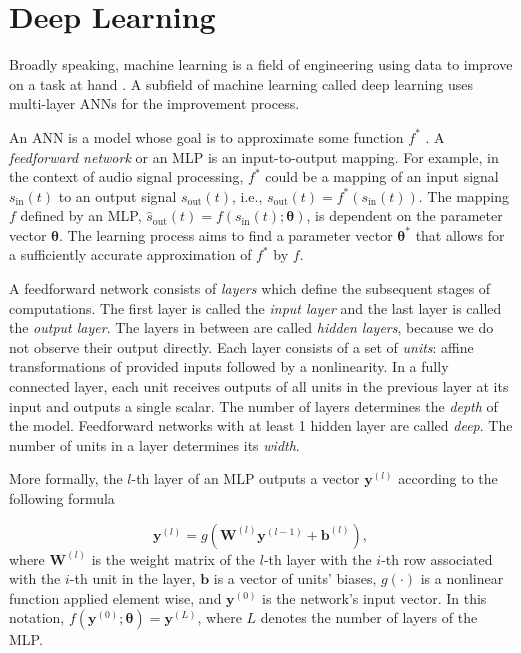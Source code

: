 
\section{Deep Learning}
\label{section:deep_learning}

Broadly speaking, machine learning is a field of engineering using data to improve on a task at hand \cite{Goodfellow-et-al-2016}. A subfield of machine learning called deep learning uses multi-layer \acp{ANN} for the improvement process. 

An \ac{ANN} is a model whose goal is to approximate some function $f^*$ \cite{Goodfellow-et-al-2016}. A \emph{feedforward network} or an \ac{MLP} is an input-to-output mapping. For example, in the context of audio signal processing, $f^*$ could be a mapping of an input signal $s_\text{in}(t)$ to an output signal $s_\text{out}(t)$, i.e., $s_\text{out}(t) = f^*(s_\text{in}(t))$. The mapping $f$ defined by an \ac{MLP}, $\hat{s}_\text{out}(t) = f(s_\text{in}(t); \pmb{\theta})$, is dependent on the parameter vector $\pmb{\theta}$. The learning process aims to find a parameter vector $\pmb{\theta^*}$ that allows for a sufficiently accurate approximation of $f^*$ by $f$.


A feedforward network consists of \emph{layers} which define the subsequent stages of computations. The first layer is called the \emph{input layer} and the last layer is called the \emph{output layer}. The layers in between are called \emph{hidden layers}, because we do not observe their output directly. Each layer consists of a set of \emph{units}: affine transformations of provided inputs followed by a nonlinearity. In a fully connected layer, each unit receives outputs of all units in the previous layer at its input and outputs a single scalar. The number of layers determines the \emph{depth} of the model. Feedforward networks with at least 1 hidden layer are called \emph{deep}. The number of units in a layer determines its \emph{width}.

More formally, the $l$-th layer of an \ac{MLP} outputs a vector $\pmb{y}^{(l)}$ according to the following formula

\begin{equation}
  \pmb{y}^{(l)} = g ( \pmb{W}^{(l)} \pmb{y}^{(l-1)} + \pmb{b}^{(l)}),
  \label{eq:mlp_forward_pass}
\end{equation}
where $\pmb{W}^{(l)}$ is the weight matrix of the $l$-th layer with the $i$-th row associated with the $i$-th unit in the layer, $\pmb{b}$ is a vector of units' biases, $g(\cdot)$ is a nonlinear function applied element wise, and $\pmb{y}^{(0)}$ is the network's input vector. In this notation, $f(\pmb{y}^{(0)};\pmb{\theta}) = \pmb{y}^{(L)}$, where $L$ denotes the number of layers of the \ac{MLP}.

